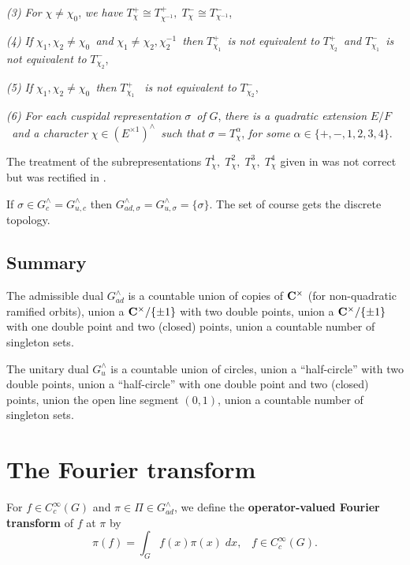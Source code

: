 \documentclass[11pt, a4paper]{article}
\begin{document}
{\em (3) For }$\chi \neq \chi _0$, {\em we have }$T_\chi ^{+}\cong T_{\chi
^{-1}}^{+},\;T_\chi ^{-}\cong T_{\chi ^{-1}}^{-}$,

{\em (4) If }$\chi _1,\chi _2\neq \chi _0${\em \ and }$\chi _1\neq \chi _2,\chi
_2^{-1}${\em \ then }$T_{\chi _1}^{+}${\em \ is not equivalent to }$T_{\chi
_2}^{+}${\em \ and }$T_{\chi _1}^{-}${\em \ is not equivalent to }$T_{\chi
_2}^{-}$,

{\em (5) If }$\chi _1,\chi _2\neq \chi _0${\em \ then }$T_{\chi _1}^{+}${\em %
\ is not equivalent to }$T_{\chi _2}^{-}$,

{\em (6) For each cuspidal representation }$\sigma ${\em \ of }$G$, {\em %
there is a quadratic extension }$E/F${\em \ and a character }$\chi \in
(E^{\times 1})^{\wedge }${\em \ such that }$\sigma =T_\chi ^\alpha $, {\em %
for some }$\alpha \in \{+,-,1,2,3,4\}$.

The treatment of the subrepresentations $T_\chi ^1,\;T_\chi ^2,\;T_\chi
^3,\;T_\chi ^4$ given in \cite{GG} was not correct but was rectified in \cite{SS1}.

If $\sigma \in G_c^{\wedge }=G_{u,c}^{\wedge }$ then $G_{ad,\sigma }^{\wedge
}=G_{u,\sigma }^{\wedge }=\{\sigma \}$. The set of course gets the discrete
topology.

\subsection{Summary}

The admissible dual $G_{ad}^{\wedge }$ is a countable union of copies of $%
{\bf C}^{\times }$ (for non-quadratic ramified orbits), union a ${\bf C}^{\times }/\{\pm 1\}$ with two
double points, union a ${\bf C}^{\times }/\{\pm 1\}$ with one double point
and two (closed) points, union a countable number of singleton sets.

The unitary dual $G_u^{\wedge }$ is a countable union of circles, union a
``half-circle'' with two double points, union a ``half-circle'' with one
double point and two (closed) points, union the open line segment $(0,1)$,
union a countable number of singleton sets.


\section{The Fourier transform}

For $f\in C_c^\infty (G)$ and $\pi \in \Pi \in G_{ad}^{\wedge }$, we define
the {\bf operator-valued Fourier transform} of $f$ at $\pi $ by
\[
\pi (f)=\int_Gf(x)\pi (x)\;dx,\;\;\;f\in C_c^\infty (G).
\]
\end{document}

